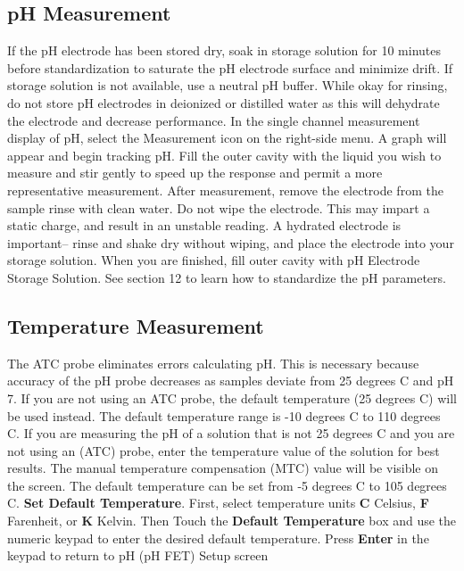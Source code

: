 \documentclass[12pt]{../SOP3_beta}\usepackage[]{graphicx}\usepackage[]{color}
\begin{document}
\subsection{pH Measurement}
\NP If the pH electrode has been stored dry, soak in storage solution for 10 minutes before standardization to saturate the pH electrode surface and minimize drift. If storage solution is not available, use a neutral pH buffer. While okay for rinsing, do not store pH electrodes in deionized or distilled water as this will dehydrate the electrode and decrease performance.
\NP In the single channel measurement display of pH, select the Measurement icon on the right-side menu. A graph will appear and begin tracking pH.
\NP Fill the outer cavity with the liquid you wish to measure and stir gently to speed up the response and permit a more representative measurement.
\NP After measurement, remove the electrode from the sample rinse with clean water. Do not wipe the electrode. This may impart a static charge, and result in an unstable reading. A hydrated electrode is important– rinse and shake dry without wiping, and place the electrode into your storage solution.
\NP When you are finished, fill outer cavity with pH Electrode Storage Solution.
\NP See section 12 to learn how to standardize the pH parameters.

\subsection{Temperature Measurement}
\NP The ATC probe eliminates errors calculating pH. This is necessary because accuracy of the pH probe decreases as samples deviate from 25 degrees C and pH 7. If you are not using an ATC probe, the default temperature (25 degrees C) will be used instead. The default temperature range is -10 degrees C to 110 degrees C. 
\NP If  you  are measuring the  pH  of  a  solution  that  is  not  25 degrees C  and  you  are  not  using  an (ATC)  probe, enter  the  temperature  value  of  the  solution  for  best  results.
The manual temperature compensation (MTC) value will be visible on the screen. The default temperature can be set from -5 degrees C to 105 degrees C.
\NP\textbf{Set Default Temperature}. First, select temperature units \textbf{C} Celsius, \textbf{F} Farenheit, or \textbf{K} Kelvin. Then Touch the \textbf{Default Temperature} box and use the numeric keypad to enter the desired default temperature.
Press \textbf{Enter} in the keypad to return to pH (pH FET) Setup screen
\end{document}
